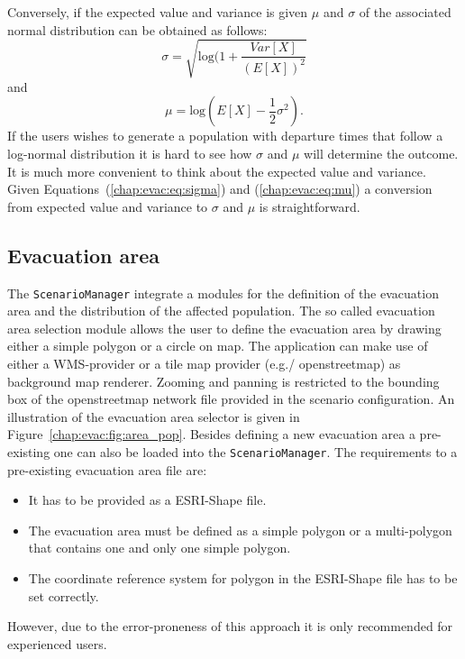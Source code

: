 Conversely, if the expected value and variance is given $\mu$ and $\sigma$ of the associated normal distribution can be obtained as follows:
\begin{equation}
\sigma = \sqrt{\text{log}(1+\frac{Var[X]}{(E[X])^2}}\label{chap:evac:eq:sigma}
\end{equation}
and 
\begin{equation}
\mu = \text{log}(E[X] - \frac{1}{2}\sigma^2).\label{chap:evac:eq:mu}
\end{equation}
If the users wishes to generate a population with departure times that follow a log-normal distribution it is hard to see how $\sigma$ and $\mu$ will determine the outcome. It is much more convenient to think about the expected value and variance. Given Equations~(\ref{chap:evac:eq:sigma}) and (\ref{chap:evac:eq:mu}) a conversion from expected value and variance to $\sigma$ and $\mu$ is straightforward.

\subsection{Evacuation area}%
The \lstinline+ScenarioManager+ integrate a modules for the definition of the evacuation area and the distribution of the affected population. The so called evacuation area selection module allows the user to define the evacuation area by drawing either a simple polygon or a circle on map. The application can make use of either a WMS-provider or a tile map provider (e.g./ openstreetmap) as background map renderer. Zooming and panning is restricted to the bounding box of the openstreetmap network file provided in the scenario configuration. An illustration of the evacuation area selector is given in Figure~\ref{chap:evac:fig:area_pop}. Besides defining a new evacuation area a pre-existing one can also be loaded into the \lstinline+ScenarioManager+. The requirements to a pre-existing evacuation area file are:
\begin{itemize}
\item It has to be provided as a ESRI-Shape file.
\item The evacuation area must be defined as a simple polygon or a multi-polygon that contains one and only one simple polygon.
\item The coordinate reference system for polygon in the ESRI-Shape file has to be set correctly. 
\end{itemize}
However, due to the error-proneness of this approach it is only recommended for experienced users.

